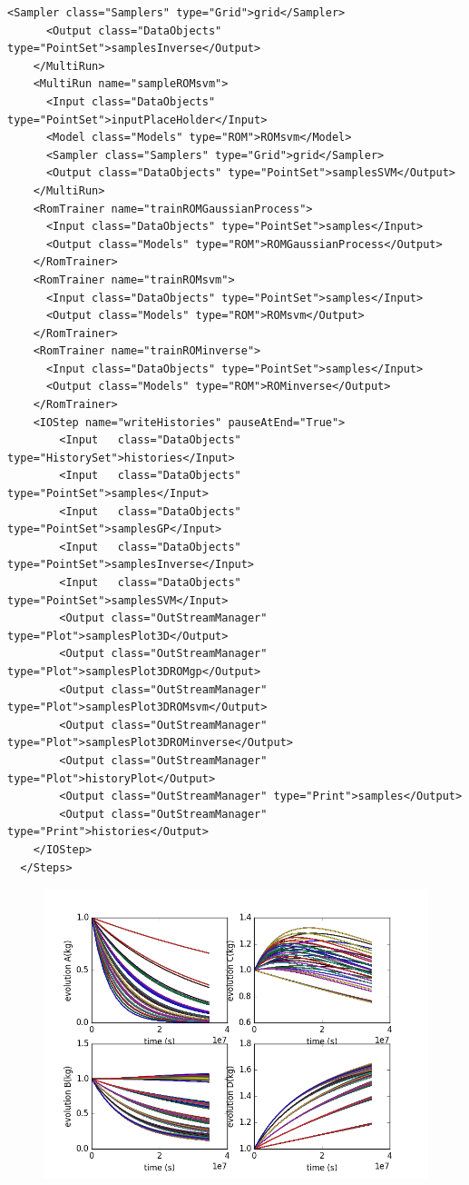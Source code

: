 \begin{enumerate}
\begin{lstlisting}[style=XML,morekeywords={arg,extension,pauseAtEnd,overwrite}]
      <Sampler class="Samplers" type="Grid">grid</Sampler>
      <Output class="DataObjects" type="PointSet">samplesInverse</Output>
    </MultiRun>
    <MultiRun name="sampleROMsvm">
      <Input class="DataObjects" type="PointSet">inputPlaceHolder</Input>
      <Model class="Models" type="ROM">ROMsvm</Model>
      <Sampler class="Samplers" type="Grid">grid</Sampler>
      <Output class="DataObjects" type="PointSet">samplesSVM</Output>
    </MultiRun>
    <RomTrainer name="trainROMGaussianProcess">
      <Input class="DataObjects" type="PointSet">samples</Input>
      <Output class="Models" type="ROM">ROMGaussianProcess</Output>
    </RomTrainer>
    <RomTrainer name="trainROMsvm">
      <Input class="DataObjects" type="PointSet">samples</Input>
      <Output class="Models" type="ROM">ROMsvm</Output>
    </RomTrainer>
    <RomTrainer name="trainROMinverse">
      <Input class="DataObjects" type="PointSet">samples</Input>
      <Output class="Models" type="ROM">ROMinverse</Output>
    </RomTrainer>
    <IOStep name="writeHistories" pauseAtEnd="True">
        <Input   class="DataObjects"      type="HistorySet">histories</Input>
        <Input   class="DataObjects"      type="PointSet">samples</Input>
        <Input   class="DataObjects"      type="PointSet">samplesGP</Input>
        <Input   class="DataObjects"      type="PointSet">samplesInverse</Input>
        <Input   class="DataObjects"      type="PointSet">samplesSVM</Input>
        <Output class="OutStreamManager" type="Plot">samplesPlot3D</Output>
        <Output class="OutStreamManager" type="Plot">samplesPlot3DROMgp</Output>
        <Output class="OutStreamManager" type="Plot">samplesPlot3DROMsvm</Output>
        <Output class="OutStreamManager" type="Plot">samplesPlot3DROMinverse</Output>
        <Output class="OutStreamManager" type="Plot">historyPlot</Output>
        <Output class="OutStreamManager" type="Print">samples</Output>
        <Output class="OutStreamManager" type="Print">histories</Output>
    </IOStep>
  </Steps>
\end{lstlisting}
 \begin{figure}[h!]
  \centering
  \includegraphics[scale=0.7]{pics/reducedOrderModelingHistoriesPhysicalModel.png}

\end{figure}
\end{enumerate}
